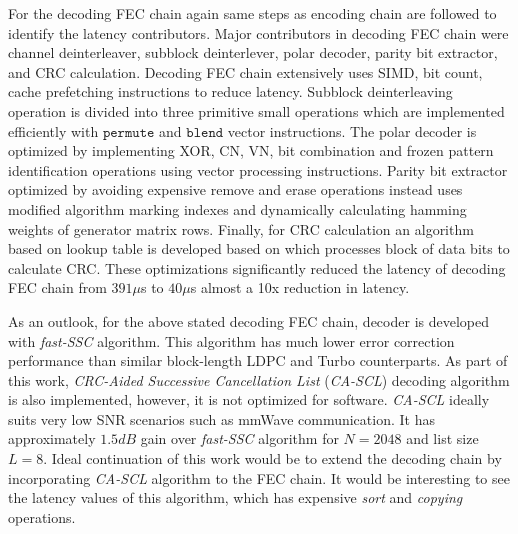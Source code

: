 For the decoding FEC chain again same steps as encoding chain are followed to identify the latency contributors. Major contributors in decoding FEC chain were channel deinterleaver, subblock deinterlever, polar decoder, parity bit extractor, and CRC calculation. Decoding FEC chain extensively uses SIMD, bit count, cache prefetching instructions to reduce latency. Subblock deinterleaving operation is divided into three primitive small operations which are implemented efficiently with $\mathtt{permute}$ and $\mathtt{blend}$ vector instructions. The polar decoder is optimized by implementing XOR, CN, VN, bit combination and frozen pattern identification operations using vector processing instructions. Parity bit extractor optimized by avoiding expensive remove and erase operations instead uses modified algorithm marking indexes and dynamically calculating hamming weights of generator matrix rows. Finally, for CRC calculation an algorithm based on lookup table is developed based on \cite{Sarwate:1988:CCR:63030.63037} which processes block of data bits to calculate CRC. These optimizations significantly reduced the latency of decoding FEC chain from $391 \mu$s to $40\mu$s almost a 10x reduction in latency. \newline

As an outlook, for the above stated decoding FEC chain, decoder is developed with \emph{fast-SSC} algorithm. This algorithm has much lower error correction performance than similar block-length LDPC and Turbo counterparts. As part of this work, \emph{CRC-Aided Successive Cancellation List} (\emph{CA-SCL})\cite{SCL} decoding algorithm is also implemented, however, it is not optimized for software. \emph{CA-SCL} ideally suits very low SNR scenarios such as mmWave communication. It has approximately $1.5dB$ gain over \emph{fast-SSC} algorithm for $N=2048$ and list size $L = 8$. Ideal continuation of this work would be to extend the decoding chain by incorporating \emph{CA-SCL} algorithm to the FEC chain. It would be interesting to see the latency values of this algorithm, which has expensive \emph{sort} and \emph{copying} operations.